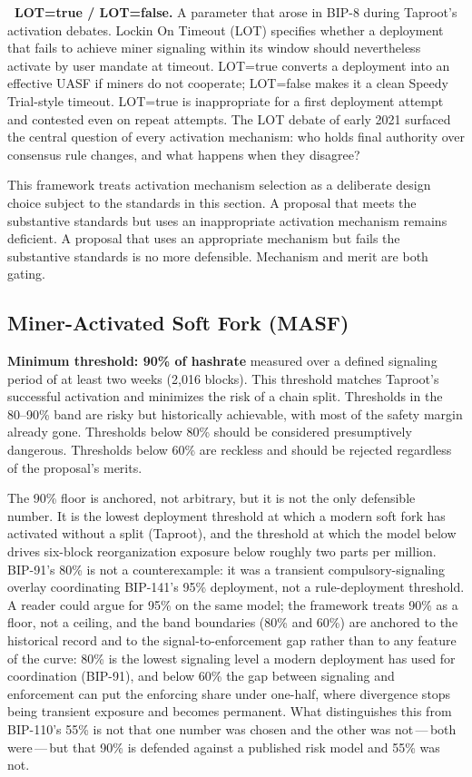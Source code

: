 \documentclass[11pt, twoside, openright]{book}
\newcommand{\reqitem}[2]{\medskip\noindent\textbf{#1\ #2}\quad\ignorespaces}
\begin{document}
\reqitem{}{LOT=true / LOT=false.} A parameter that arose in BIP-8 during Taproot's activation debates. Lockin On Timeout (LOT) specifies whether a deployment that fails to achieve miner signaling within its window should nevertheless activate by user mandate at timeout. LOT=true converts a deployment into an effective UASF if miners do not cooperate; LOT=false makes it a clean Speedy Trial-style timeout. LOT=true is inappropriate for a first deployment attempt and contested even on repeat attempts. The LOT debate of early 2021 surfaced the central question of every activation mechanism: who holds final authority over consensus rule changes, and what happens when they disagree?

\medskip

This framework treats activation mechanism selection as a deliberate design choice subject to the standards in this section. A proposal that meets the substantive standards but uses an inappropriate activation mechanism remains deficient. A proposal that uses an appropriate mechanism but fails the substantive standards is no more defensible. Mechanism and merit are both gating.

\subsection*{Miner-Activated Soft Fork (MASF)}

\textbf{Minimum threshold: 90\% of hashrate} measured over a defined signaling period of at least two weeks (2{,}016 blocks). This threshold matches Taproot's successful activation and minimizes the risk of a chain split. Thresholds in the 80--90\% band are risky but historically achievable, with most of the safety margin already gone. Thresholds below 80\% should be considered presumptively dangerous. Thresholds below 60\% are reckless and should be rejected regardless of the proposal's merits.

The 90\% floor is anchored, not arbitrary, but it is not the only defensible number. It is the lowest deployment threshold at which a modern soft fork has activated without a split (Taproot), and the threshold at which the model below drives six-block reorganization exposure below roughly two parts per million. BIP-91's 80\% is not a counterexample: it was a transient compulsory-signaling overlay coordinating BIP-141's 95\% deployment, not a rule-deployment threshold. A reader could argue for 95\% on the same model; the framework treats 90\% as a floor, not a ceiling, and the band boundaries (80\% and 60\%) are anchored to the historical record and to the signal-to-enforcement gap rather than to any feature of the curve: 80\% is the lowest signaling level a modern deployment has used for coordination (BIP-91), and below 60\% the gap between signaling and enforcement can put the enforcing share under one-half, where divergence stops being transient exposure and becomes permanent. What distinguishes this from BIP-110's 55\% is not that one number was chosen and the other was not\,---\,both were\,---\,but that 90\% is defended against a published risk model and 55\% was not.
\end{document}
